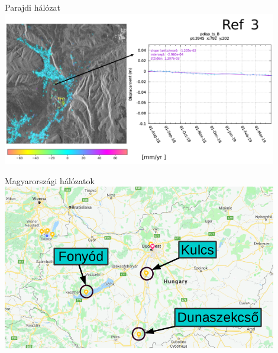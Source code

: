 \documentclass{beamer}
\begin{document}
\begin{frame}{Parajdi hálózat}
\includegraphics[width=0.9\textwidth]{parajd_ts4.png}
\end{frame}


\begin{frame}{Magyarországi hálózatok}
\includegraphics[width=0.9\textwidth]{hungary_networks.png}
\end{frame}
\end{document}
